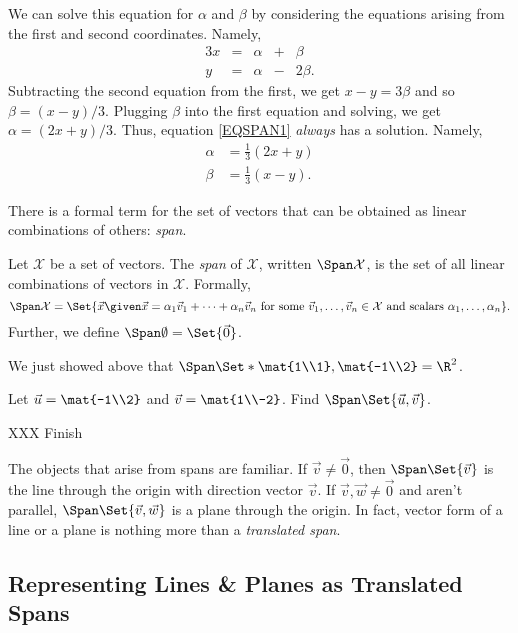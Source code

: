 We can solve this equation for $\alpha$ and $\beta$ by considering the equations arising from the
first and second coordinates. Namely,
\begin{alignat*}{3}
	x &{}={}& \alpha &{}+{}& \beta\\
	y &{}={}& \alpha &{}-{}& 2\beta.
\end{alignat*}
Subtracting the second equation from the first, we get $x-y=3\beta$ and so $\beta=(x-y)/3$. Plugging 
$\beta$ into the first equation and solving, we get $\alpha=(2x+y)/3$. Thus, equation \eqref{EQSPAN1}
\emph{always} has a solution. Namely,
\begin{align*}
	\alpha &= \tfrac{1}{3}(2x+y)\\
	\beta &= \tfrac{1}{3}(x-y).
\end{align*}

There is a formal term for the set of vectors that can be obtained as linear combinations
of others: \emph{span}.

\begin{definition}[Span]
	Let $\mathcal X$ be a set of vectors. The \emph{span} of $\mathcal X$, written $\Span \mathcal X$,
	is the set of all linear combinations of vectors in $\mathcal X$. Formally,
	\[
	\Span \mathcal X = \Set{\vec x\given \vec x = \alpha_1\vec v_1+
	\cdots+\alpha_n\vec v_n\text{ for some }\vec v_1,\ldots,\vec v_n\in\mathcal X
	\text{ and scalars }\alpha_1,\ldots,\alpha_n}.
	\]
	Further, we define $\Span\emptyset =\Set{\vec 0}$.
\end{definition}

We just showed above that $\Span\Set*{\mat{1\\1},\mat{-1\\2}}=\R^2$.

\begin{example}
	Let $\vec u=\mat{-1\\2}$ and $\vec v=\mat{1\\-2}$. Find $\Span\Set{\vec u,\vec v}$.

	XXX Finish
\end{example}

The objects that arise from spans are familiar. If $\vec v\neq\vec 0$, then $\Span\Set{\vec v}$
is the line through the origin with direction vector $\vec v$. If $\vec v,\vec w\neq \vec 0$ and
aren't parallel, $\Span\Set{\vec v,\vec w}$ is a plane through the origin. In fact, vector form of
a line or a plane is nothing more than a \emph{translated span}.

\subsection{Representing Lines \& Planes as Translated Spans}

